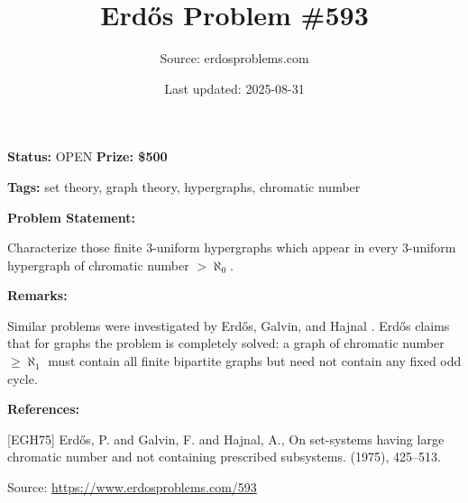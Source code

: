 \documentclass{article}
\title{Erd\H{o}s Problem \#593}
\date{Last updated: 2025-08-31}
\author{Source: erdosproblems.com}
\begin{document}
\maketitle

\noindent\textbf{Status:} OPEN \quad \textbf{Prize: \$500}

\noindent\textbf{Tags:} set theory, graph theory, hypergraphs, chromatic number

\medskip
\noindent\textbf{Problem Statement:}

Characterize those finite 3-uniform hypergraphs which appear in every 3-uniform hypergraph of chromatic number $>\aleph_0$.

\bigskip
\noindent\textbf{Remarks:}

Similar problems were investigated by Erd\H{o}s, Galvin, and Hajnal \cite{EGH75}. Erd\H{o}s claims that for graphs the problem is completely solved: a graph of chromatic number $\geq \aleph_1$ must contain all finite bipartite graphs but need not contain any fixed odd cycle.

\bigskip
\noindent\textbf{References:}

[EGH75] Erd\H{o}s, P. and Galvin, F. and Hajnal, A., On set-systems having large chromatic number and not containing prescribed subsystems. (1975), 425--513.

\bigskip
\noindent\small{Source: \url{https://www.erdosproblems.com/593}}
\end{document}

